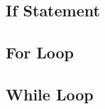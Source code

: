 \documentclass[paper=a4, fontsize=11pt]{scrartcl} %
\numberwithin{equation}{section} %
\numberwithin{figure}{section} %
\numberwithin{table}{section} %
\begin{document}
\subsection{If Statement}

\subsection{For Loop}

\subsection{While Loop}
\end{document}
